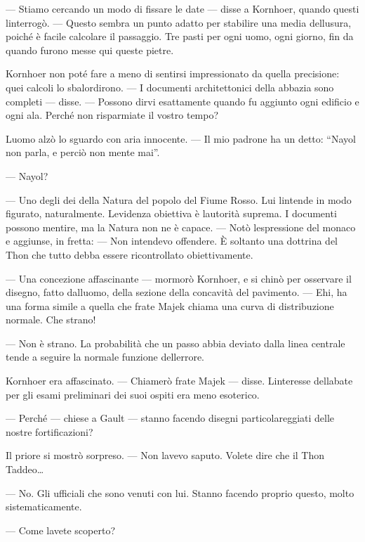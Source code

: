 --- Stiamo cercando un modo di fissare le date --- disse a Kornhoer,
quando questi l\textquotesingle interrogò. --- Questo sembra un punto
adatto per stabilire una media dell\textquotesingle usura, poiché è
facile calcolare il passaggio. Tre pasti per ogni uomo, ogni giorno, fin
da quando furono messe qui queste pietre.

Kornhoer non poté fare a meno di sentirsi impressionato da quella
precisione: quei calcoli lo sbalordirono. --- I documenti architettonici
della abbazia sono completi --- disse. --- Possono dirvi esattamente
quando fu aggiunto ogni edificio e ogni ala. Perché non risparmiate il
vostro tempo?

L\textquotesingle uomo alzò lo sguardo con aria innocente. --- Il mio
padrone ha un detto: ``Nayol non parla, e perciò non mente mai''.

--- Nayol?

--- Uno degli dei della Natura del popolo del Fiume Rosso. Lui
l\textquotesingle intende in modo figurato, naturalmente.
L\textquotesingle evidenza obiettiva è l\textquotesingle autorità
suprema. I documenti possono mentire, ma la Natura non ne è capace. ---
Notò l\textquotesingle espressione del monaco e aggiunse, in fretta: ---
Non intendevo offendere. È soltanto una dottrina del Thon che tutto
debba essere ricontrollato obiettivamente.

--- Una concezione affascinante --- mormorò Kornhoer, e si chinò per
osservare il disegno, fatto dall\textquotesingle uomo, della sezione
della concavità del pavimento. --- Ehi, ha una forma simile a quella che
frate Majek chiama una curva di distribuzione normale. Che strano!

--- Non è strano. La probabilità che un passo abbia deviato dalla linea
centrale tende a seguire la normale funzione
dell\textquotesingle errore.

Kornhoer era affascinato. --- Chiamerò frate Majek --- disse.
L\textquotesingle interesse dell\textquotesingle abate per gli esami
preliminari dei suoi ospiti era meno esoterico.

--- Perché --- chiese a Gault --- stanno facendo disegni
particolareggiati delle nostre fortificazioni?

Il priore si mostrò sorpreso. --- Non l\textquotesingle avevo saputo.
Volete dire che il Thon Taddeo\ldots{}

--- No. Gli ufficiali che sono venuti con lui. Stanno facendo proprio
questo, molto sistematicamente.

--- Come l\textquotesingle avete scoperto?

